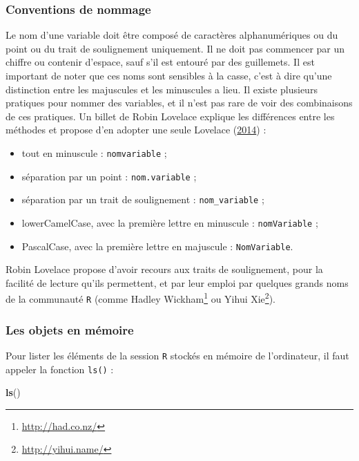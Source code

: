 \documentclass[
  11pt,
]{book}
\newenvironment{Shaded}{\begin{snugshade}}{\end{snugshade}}
\newcommand{\KeywordTok}[1]{\textcolor[rgb]{0.13,0.29,0.53}{\textbf{#1}}}
\newcommand{\NormalTok}[1]{#1}
\providecommand{\tightlist}{%
  \setlength{\itemsep}{0pt}\setlength{\parskip}{0pt}}
\numberwithin{equation}{section}
\numberwithin{countremarque}{section}
\begin{document}
\hypertarget{introduction-espace-nommage}{%
\subsubsection{Conventions de nommage}\label{introduction-espace-nommage}}

Le nom d'une variable doit être composé de caractères alphanumériques ou du point ou du trait de soulignement uniquement. Il ne doit pas commencer par un chiffre ou contenir d'espace, sauf s'il est entouré par des guillemets. Il est important de noter que ces noms sont sensibles à la casse, c'est à dire qu'une distinction entre les majuscules et les minuscules a lieu. Il existe plusieurs pratiques pour nommer des variables, et il n'est pas rare de voir des combinaisons de ces pratiques. Un billet de Robin Lovelace explique les différences entre les méthodes et propose d'en adopter une seule Lovelace (\protect\hyperlink{ref-Lovelace_2014_Consistent}{2014}) :

\begin{itemize}
\tightlist
\item
  tout en minuscule : \texttt{nomvariable} ;
\item
  séparation par un point : \texttt{nom.variable} ;
\item
  séparation par un trait de soulignement : \texttt{nom\_variable} ;
\item
  lowerCamelCase, avec la première lettre en minuscule : \texttt{nomVariable} ;
\item
  PascalCase, avec la première lettre en majuscule : \texttt{NomVariable}.
\end{itemize}

Robin Lovelace propose d'avoir recours aux traits de soulignement, pour la facilité de lecture qu'ils permettent, et par leur emploi par quelques grands noms de la communauté \texttt{R} (comme Hadley Wickham\footnote{\url{http://had.co.nz/}} ou Yihui Xie\footnote{\url{http://yihui.name/}}).

\hypertarget{les-objets-en-muxe9moire}{%
\subsubsection{Les objets en mémoire}\label{les-objets-en-muxe9moire}}

Pour lister les éléments de la session \texttt{R} stockés en mémoire de l'ordinateur, il faut appeler la fonction \texttt{ls()} :

\begin{Shaded}
\begin{Highlighting}[]
\KeywordTok{ls}\NormalTok{()}
\end{Highlighting}
\end{Shaded}
\end{document}
